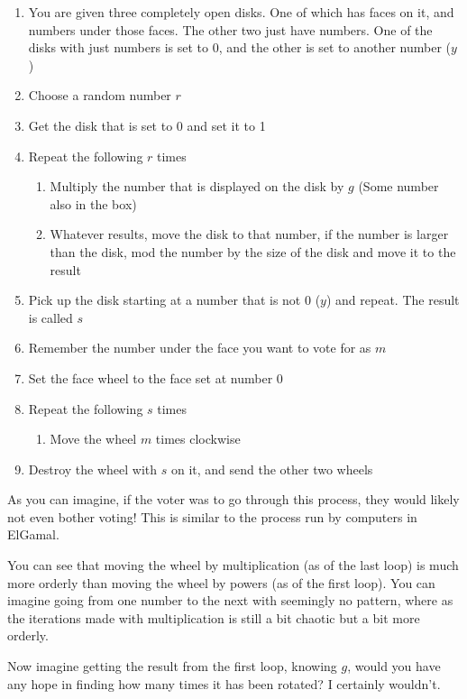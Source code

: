 \documentclass{article}
\begin{document}
  \begin{enumerate}
    \item You are given three completely open disks. One of which has faces on it, and numbers under those faces. The other two just have numbers. One of the disks with just numbers is set to 0, and the other is set to another number ($y$)
    \item Choose a random number $r$
    \item Get the disk that is set to 0 and set it to 1
    \item Repeat the following $r$ times
    \begin{enumerate}
      \item Multiply the number that is displayed on the disk by $g$ (Some number also in the box)
      \item Whatever results, move the disk to that number, if the number is larger than the disk,
        mod the number by the size of the disk and move it to the result
    \end{enumerate}
    \item Pick up the disk starting at a number that is not 0 ($y$) and repeat. The result is called $s$
    \item Remember the number under the face you want to vote for as $m$
    \item Set the face wheel to the face set at number 0
    \item Repeat the following $s$ times
    \begin{enumerate}
      \item Move the wheel $m$ times clockwise
    \end{enumerate}
    \item Destroy the wheel with $s$ on it, and send the other two wheels
  \end{enumerate}

  As you can imagine, if the voter was to go through this process, they would likely
  not even bother voting! This is similar to the process run by computers in
  ElGamal.

  You can see that moving the wheel by multiplication (as of the last loop)
  is much more orderly than moving the wheel by powers (as of the first loop).
  You can imagine going from one number to the next with seemingly no pattern,
  where as the iterations made with multiplication is still a bit chaotic but
  a bit more orderly.

  Now imagine getting the result from the first loop, knowing $g$, would you have
  any hope in finding how many times it has been rotated? I certainly wouldn't.
\end{document}
